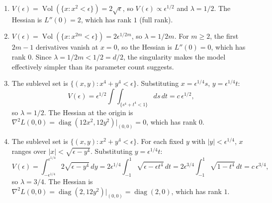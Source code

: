 \documentclass[11pt]{article}
\begin{document}
\begin{solution}
\begin{enumerate}
    \item
        $V(\epsilon) = \operatorname{Vol}(\{x : x^2 < \epsilon\}) = 2\sqrt{\epsilon}$, so $V(\epsilon) \propto \epsilon^{1/2}$ and $\lambda = 1/2$. The Hessian is $L''(0) = 2$, which has rank $1$ (full rank).
    \item
        $V(\epsilon) = \operatorname{Vol}(\{x : x^{2m} < \epsilon\}) = 2\epsilon^{1/2m}$, so $\lambda = 1/2m$. For $m \geq 2$, the first $2m - 1$ derivatives vanish at $x = 0$, so the Hessian is $L''(0) = 0$, which has rank $0$. Since $\lambda = 1/2m < 1/2 = d/2$, the singularity makes the model effectively simpler than its parameter count suggests.
    \item
        The sublevel set is $\{(x,y) : x^4 + y^4 < \epsilon\}$. Substituting $x = \epsilon^{1/4}s$, $y = \epsilon^{1/4}t$:
        \[
            V(\epsilon) = \epsilon^{1/2} \int\!\!\int_{\{s^4 + t^4 < 1\}} ds\, dt = c\,\epsilon^{1/2},
        \]
        so $\lambda = 1/2$. The Hessian at the origin is $\nabla^2L(0,0) = \operatorname{diag}(12x^2, 12y^2)\big|_{(0,0)} = 0$, which has rank $0$.
    \item
        The sublevel set is $\{(x,y) : x^2 + y^4 < \epsilon\}$. For each fixed $y$ with $|y| < \epsilon^{1/4}$, $x$ ranges over $|x| < \sqrt{\epsilon - y^4}$. Substituting $y = \epsilon^{1/4}t$:
        \[
            V(\epsilon) = \int_{-\epsilon^{1/4}}^{\epsilon^{1/4}} 2\sqrt{\epsilon - y^4}\, dy = 2\epsilon^{1/4} \int_{-1}^{1} \sqrt{\epsilon - \epsilon t^4}\, dt = 2\epsilon^{3/4} \int_{-1}^{1} \sqrt{1 - t^4}\, dt = c\,\epsilon^{3/4},
        \]
        so $\lambda = 3/4$. The Hessian is $\nabla^2L(0,0) = \operatorname{diag}(2, 12y^2)\big|_{(0,0)} = \operatorname{diag}(2, 0)$, which has rank $1$.
\end{enumerate}
\end{solution}
\end{document}

